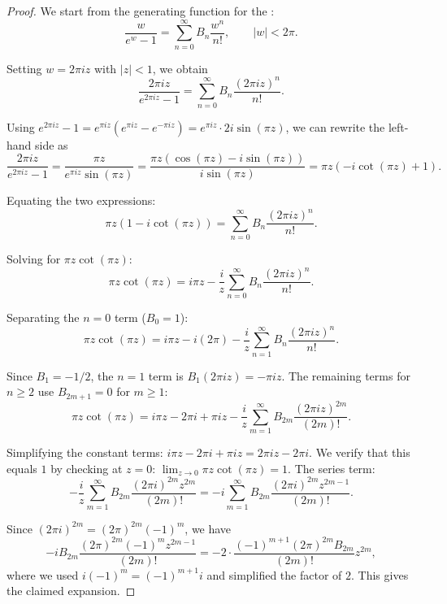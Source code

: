 \begin{proof}
    We start from the generating function for the :
    $$\frac{w}{e^w - 1} = \sum_{n=0}^\infty B_n \frac{w^n}{n!}, \qquad |w| < 2\pi.$$

    Setting $w = 2\pi i z$ with $|z| < 1$, we obtain
    $$\frac{2\pi i z}{e^{2\pi i z} - 1} = \sum_{n=0}^\infty B_n \frac{(2\pi i z)^n}{n!}.$$

    Using $e^{2\pi i z} - 1 = e^{\pi i z}(e^{\pi i z} - e^{-\pi i z}) = e^{\pi i z} \cdot 2i \sin(\pi z)$, we can rewrite the left-hand side as
    $$\frac{2\pi i z}{e^{2\pi i z} - 1} = \frac{\pi z}{e^{\pi i z} \sin(\pi z)} = \frac{\pi z (\cos(\pi z) - i \sin(\pi z))}{i \sin(\pi z)} = \pi z (-i \cot(\pi z) + 1).$$

    Equating the two expressions:
    $$\pi z (1 - i \cot(\pi z)) = \sum_{n=0}^\infty B_n \frac{(2\pi i z)^n}{n!}.$$

    Solving for $\pi z \cot(\pi z)$:
    $$\pi z \cot(\pi z) = i \pi z - \frac{i}{z} \sum_{n=0}^\infty B_n \frac{(2\pi i z)^n}{n!}.$$

    Separating the $n=0$ term ($B_0 = 1$):
    $$\pi z \cot(\pi z) = i \pi z - i(2\pi) - \frac{i}{z} \sum_{n=1}^\infty B_n \frac{(2\pi i z)^n}{n!}.$$

    Since $B_1 = -1/2$, the $n=1$ term is $B_1 (2\pi i z) = -\pi i z$. The remaining terms for $n \geq 2$ use $B_{2m+1} = 0$ for $m \geq 1$:
    $$\pi z \cot(\pi z) = i \pi z - 2\pi i + \pi i z - \frac{i}{z} \sum_{m=1}^\infty B_{2m} \frac{(2\pi i z)^{2m}}{(2m)!}.$$

    Simplifying the constant terms: $i\pi z - 2\pi i + \pi i z = 2\pi i z - 2\pi i$. We verify that this equals $1$ by checking at $z=0$: $\lim_{z \to 0} \pi z \cot(\pi z) = 1$. The series term:
    $$-\frac{i}{z} \sum_{m=1}^\infty B_{2m} \frac{(2\pi i)^{2m} z^{2m}}{(2m)!} = -i \sum_{m=1}^\infty B_{2m} \frac{(2\pi i)^{2m} z^{2m-1}}{(2m)!}.$$

    Since $(2\pi i)^{2m} = (2\pi)^{2m} (-1)^m$, we have
    $$-i B_{2m} \frac{(2\pi)^{2m}(-1)^m z^{2m-1}}{(2m)!} = -2 \cdot \frac{(-1)^{m+1}(2\pi)^{2m} B_{2m}}{(2m)!} z^{2m},$$
    where we used $i(-1)^m = (-1)^{m+1} i$ and simplified the factor of $2$. This gives the claimed expansion.
\end{proof}